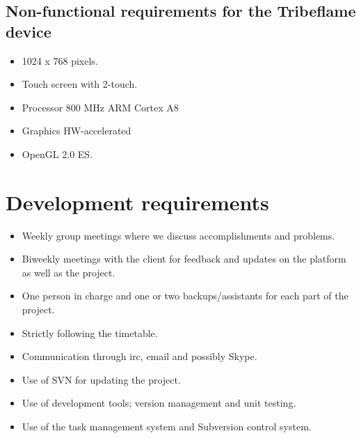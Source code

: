 \documentclass[12pt,a4paper]{article}
\begin{document}
\subsection{Non-functional requirements for the Tribeflame device}

\begin{itemize}
\item 1024 x 768 pixels.
\item Touch screen with 2-touch. 
\item Processor 800 MHz ARM Cortex A8
\item Graphics HW-accelerated
\item OpenGL 2.0 ES.
\end{itemize}

\section{Development requirements}

\begin{itemize}
\item Weekly group meetings where we discuss accomplishments and problems.
\item Biweekly meetings with the client for feedback and updates on
  the platform as well as the project.
\item One person in charge and one or two backups/assistants for each
  part of the project.
\item Strictly following the timetable.
\item Communication through irc, email and possibly Skype.
\item Use of SVN for updating the project.
\item Use of development tools; version management and unit testing.
\item Use of the task management system and Subversion control system.
\end{itemize}
\end{document}
